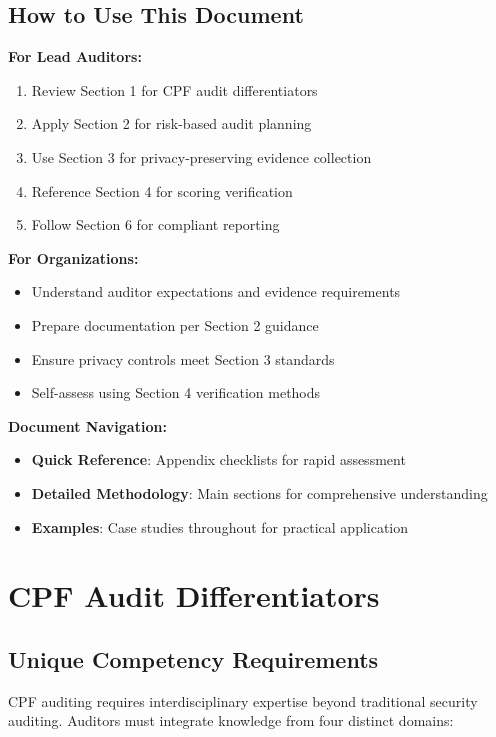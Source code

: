 \documentclass[11pt,a4paper]{article}
\begin{document}
\subsection{How to Use This Document}

\textbf{For Lead Auditors:}
\begin{enumerate}
\item Review Section 1 for CPF audit differentiators
\item Apply Section 2 for risk-based audit planning
\item Use Section 3 for privacy-preserving evidence collection
\item Reference Section 4 for scoring verification
\item Follow Section 6 for compliant reporting
\end{enumerate}

\textbf{For Organizations:}
\begin{itemize}
\item Understand auditor expectations and evidence requirements
\item Prepare documentation per Section 2 guidance
\item Ensure privacy controls meet Section 3 standards
\item Self-assess using Section 4 verification methods
\end{itemize}

\textbf{Document Navigation:}
\begin{itemize}
\item \textbf{Quick Reference}: Appendix checklists for rapid assessment
\item \textbf{Detailed Methodology}: Main sections for comprehensive understanding
\item \textbf{Examples}: Case studies throughout for practical application
\end{itemize}

\section{CPF Audit Differentiators}

\subsection{Unique Competency Requirements}

CPF auditing requires interdisciplinary expertise beyond traditional security auditing. Auditors must integrate knowledge from four distinct domains:
\end{document}
